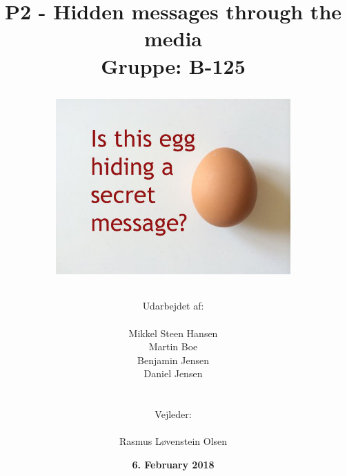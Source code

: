 \documentclass[11pt]{article}
\title{
    P2 - Hidden messages through the media 
    \\ 
    Gruppe: B-125
    \\
    \begin{figure}[!h]
        \centering
        \includegraphics[width=0.8\textwidth, angle =0]{Projectdoc/Egg-Message.jpg}
        \label{fig:FrontPage}
    \end{figure}
}
\author{
    Udarbejdet af:\\
    \\
    Mikkel Steen Hansen\\
    Martin Boe\\
    Benjamin Jensen\\
    Daniel Jensen\\
    \\\\
    Vejleder:\\ 
    \\
    Rasmus Løvenstein Olsen\\
}
\date{\textbf{6. February 2018}}
\renewcommand{\baselinestretch}{1.20}
\begin{document}
    \begin{titlepage}
        \clearpage
        \maketitle
        \thispagestyle{empty}
    \end{titlepage}
    
    
    
    \renewcommand{\baselinestretch}{0.8} 
    \tableofcontents
    \renewcommand{\baselinestretch}{1.20} 
    \newpage
    

    
    
    
    
    
    
    
    
    \newpage
    
    
    
\end{document}
